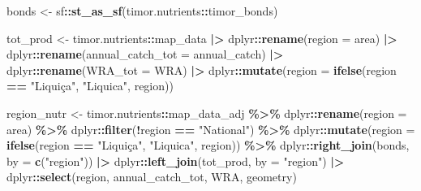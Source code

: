 \documentclass[
]{book}
\newenvironment{Shaded}{\begin{snugshade}}{\end{snugshade}}
\newcommand{\AttributeTok}[1]{\textcolor[rgb]{0.13,0.29,0.53}{#1}}
\newcommand{\FunctionTok}[1]{\textcolor[rgb]{0.13,0.29,0.53}{\textbf{#1}}}
\newcommand{\NormalTok}[1]{#1}
\newcommand{\OtherTok}[1]{\textcolor[rgb]{0.56,0.35,0.01}{#1}}
\newcommand{\SpecialCharTok}[1]{\textcolor[rgb]{0.81,0.36,0.00}{\textbf{#1}}}
\newcommand{\StringTok}[1]{\textcolor[rgb]{0.31,0.60,0.02}{#1}}
\begin{document}
\begin{Shaded}
\begin{Highlighting}[]
\NormalTok{bonds }\OtherTok{\textless{}{-}}\NormalTok{ sf}\SpecialCharTok{::}\FunctionTok{st\_as\_sf}\NormalTok{(timor.nutrients}\SpecialCharTok{::}\NormalTok{timor\_bonds)}

\NormalTok{tot\_prod }\OtherTok{\textless{}{-}} 
\NormalTok{  timor.nutrients}\SpecialCharTok{::}\NormalTok{map\_data }\SpecialCharTok{|\textgreater{}} 
\NormalTok{    dplyr}\SpecialCharTok{::}\FunctionTok{rename}\NormalTok{(}\AttributeTok{region =}\NormalTok{ area) }\SpecialCharTok{|\textgreater{}} 
\NormalTok{    dplyr}\SpecialCharTok{::}\FunctionTok{rename}\NormalTok{(}\AttributeTok{annual\_catch\_tot =}\NormalTok{ annual\_catch) }\SpecialCharTok{|\textgreater{}} 
\NormalTok{    dplyr}\SpecialCharTok{::}\FunctionTok{rename}\NormalTok{(}\AttributeTok{WRA\_tot =}\NormalTok{ WRA) }\SpecialCharTok{|\textgreater{}} 
\NormalTok{    dplyr}\SpecialCharTok{::}\FunctionTok{mutate}\NormalTok{(}\AttributeTok{region =} \FunctionTok{ifelse}\NormalTok{(region }\SpecialCharTok{==} \StringTok{"Liquiça"}\NormalTok{, }\StringTok{"Liquica"}\NormalTok{, region))}


\NormalTok{region\_nutr }\OtherTok{\textless{}{-}}
\NormalTok{  timor.nutrients}\SpecialCharTok{::}\NormalTok{map\_data\_adj }\SpecialCharTok{\%\textgreater{}\%}
\NormalTok{  dplyr}\SpecialCharTok{::}\FunctionTok{rename}\NormalTok{(}\AttributeTok{region =}\NormalTok{ area) }\SpecialCharTok{\%\textgreater{}\%}
\NormalTok{  dplyr}\SpecialCharTok{::}\FunctionTok{filter}\NormalTok{(}\SpecialCharTok{!}\NormalTok{region }\SpecialCharTok{==} \StringTok{"National"}\NormalTok{) }\SpecialCharTok{\%\textgreater{}\%}
\NormalTok{  dplyr}\SpecialCharTok{::}\FunctionTok{mutate}\NormalTok{(}\AttributeTok{region =} \FunctionTok{ifelse}\NormalTok{(region }\SpecialCharTok{==} \StringTok{"Liquiça"}\NormalTok{, }\StringTok{"Liquica"}\NormalTok{, region)) }\SpecialCharTok{\%\textgreater{}\%}
\NormalTok{  dplyr}\SpecialCharTok{::}\FunctionTok{right\_join}\NormalTok{(bonds, }\AttributeTok{by =} \FunctionTok{c}\NormalTok{(}\StringTok{"region"}\NormalTok{)) }\SpecialCharTok{|\textgreater{}} 
\NormalTok{  dplyr}\SpecialCharTok{::}\FunctionTok{left\_join}\NormalTok{(tot\_prod, }\AttributeTok{by =} \StringTok{"region"}\NormalTok{) }\SpecialCharTok{|\textgreater{}} 
\NormalTok{  dplyr}\SpecialCharTok{::}\FunctionTok{select}\NormalTok{(region, }
\NormalTok{  annual\_catch\_tot, }
\NormalTok{  WRA,}
\NormalTok{  geometry)}


\end{Highlighting}
\end{Shaded}
\end{document}
